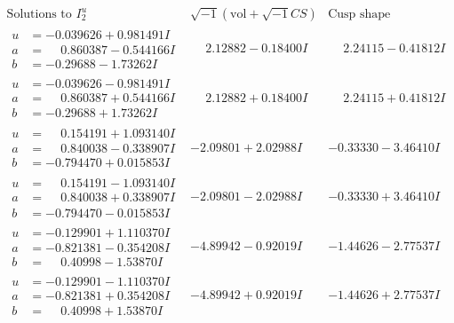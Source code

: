 \documentclass[1p]{elsarticle_modified}
\theoremstyle{definition}
\newcommand{\I}{\sqrt{-1}}
\begin{document}
$$\begin{array}{c|c|c}  
\text{Solutions to }I^u_{2}& \I (\text{vol} + \sqrt{-1}CS) & \text{Cusp shape}\\
 \hline 
\begin{aligned}
u &= -0.039626 + 0.981491 I \\
a &= \phantom{-}0.860387 - 0.544166 I \\
b &= -0.29688 - 1.73262 I\end{aligned}
 & \phantom{-}2.12882 - 0.18400 I & \phantom{-}2.24115 - 0.41812 I \\ \hline\begin{aligned}
u &= -0.039626 - 0.981491 I \\
a &= \phantom{-}0.860387 + 0.544166 I \\
b &= -0.29688 + 1.73262 I\end{aligned}
 & \phantom{-}2.12882 + 0.18400 I & \phantom{-}2.24115 + 0.41812 I \\ \hline\begin{aligned}
u &= \phantom{-}0.154191 + 1.093140 I \\
a &= \phantom{-}0.840038 - 0.338907 I \\
b &= -0.794470 + 0.015853 I\end{aligned}
 & -2.09801 + 2.02988 I & -0.33330 - 3.46410 I \\ \hline\begin{aligned}
u &= \phantom{-}0.154191 - 1.093140 I \\
a &= \phantom{-}0.840038 + 0.338907 I \\
b &= -0.794470 - 0.015853 I\end{aligned}
 & -2.09801 - 2.02988 I & -0.33330 + 3.46410 I \\ \hline\begin{aligned}
u &= -0.129901 + 1.110370 I \\
a &= -0.821381 - 0.354208 I \\
b &= \phantom{-}0.40998 - 1.53870 I\end{aligned}
 & -4.89942 - 0.92019 I & -1.44626 - 2.77537 I \\ \hline\begin{aligned}
u &= -0.129901 - 1.110370 I \\
a &= -0.821381 + 0.354208 I \\
b &= \phantom{-}0.40998 + 1.53870 I\end{aligned}
 & -4.89942 + 0.92019 I & -1.44626 + 2.77537 I \\ \hline\begin{aligned}

\end{aligned}
\end{array}$$
\end{document}

